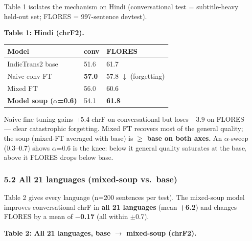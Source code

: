 \documentclass[
  11pt,
]{article}
\begin{document}
Table 1 isolates the mechanism on Hindi (conversational test =
subtitle-heavy held-out set; FLORES = 997-sentence devtest).

\textbf{Table 1: Hindi (chrF2).}

\begin{longtable}[]{@{}lll@{}}
\toprule\noalign{}
Model & conv & FLORES \\
\midrule\noalign{}
\endhead
\bottomrule\noalign{}
\endlastfoot
IndicTrans2 base & 51.6 & 61.7 \\
Naive conv-FT & \textbf{57.0} & 57.8 $\downarrow$ (forgetting) \\
Mixed FT & 56.0 & 60.6 \\
\textbf{Model soup ($\alpha$=0.6)} & 54.1 & \textbf{61.8} \\
\end{longtable}

Naive fine-tuning gains +5.4 chrF on conversational but loses $-$3.9 on
FLORES --- clear catastrophic forgetting. Mixed FT recovers most of the
general quality; the soup (mixed-FT averaged with base) is \textbf{$\ge$
base on both axes}. An $\alpha$-sweep (0.3--0.7) shows $\alpha$=0.6 is the knee: below
it general quality saturates at the base, above it FLORES drops below
base.

\hypertarget{all-21-languages-mixed-soup-vs.-base}{%
\subsubsection{5.2 All 21 languages (mixed-soup
vs.~base)}\label{all-21-languages-mixed-soup-vs.-base}}

Table 2 gives every language (n=200 sentences per test). The mixed-soup
model improves conversational chrF in \textbf{all 21 languages} (mean
\textbf{+6.2}) and changes FLORES by a mean of \textbf{$-$0.17} (all
within $\pm$0.7).

\textbf{Table 2: All 21 languages, base $\to$ mixed-soup (chrF2).}
\end{document}
